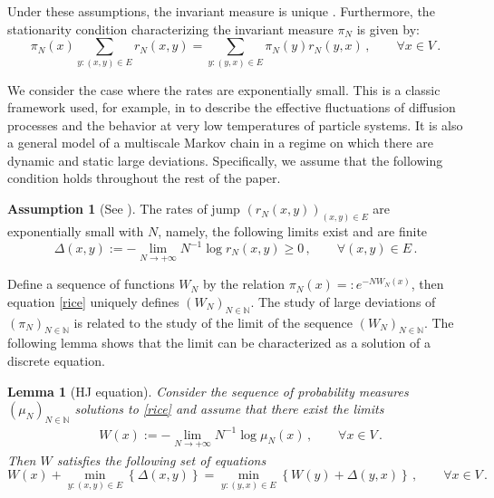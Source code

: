 \documentclass[reqno]{amsart}
\theoremstyle{plain}
\newtheorem{lemma}[theorem]{Lemma}
\theoremstyle{definition}
\newtheorem{assumption}[theorem]{Assumption}
\theoremstyle{remark}
\numberwithin{equation}{section}
\numberwithin{theorem}{section}
\newcommand{\<}{\langle}
\renewcommand{\>}{\rangle}
\begin{document}
Under these assumptions, the invariant measure is unique \cite{No}. Furthermore, the stationarity condition characterizing the invariant measure \(\pi_N\) is given by:
\begin{equation}\label{rice}
	\pi_N(x)\sum_{y: (x,y)\in E} r_N(x,y)=\sum_{y:(y,x)\in E} \pi_N(y)r_N(y,x)\,, \qquad \forall x\in V\,.
\end{equation}

We consider the case where the rates are exponentially small. This is a classic framework used, for example, in \cite{FW} to describe the effective fluctuations of diffusion processes and the behavior at very low temperatures of particle systems. It is also a general model of a multiscale Markov chain in a regime on which there are dynamic and static large deviations.  Specifically, we assume that the following condition holds throughout the rest of the paper.

\begin{assumption}[See \cite{OS2}]\label{assumption-1}
	The rates of jump $(r_N(x,y))_{(x,y)\in E}$ are exponentially small with $N$, namely, the following limits exist and are finite \begin{equation*}\Delta(x,y):=-\lim_{N\to +\infty} N^{-1}\log r_N(x,y)\geq 0\,, \qquad \forall(x,y)\in E\,.
	\end{equation*}
\end{assumption}

Define a sequence of functions $W_N$ by the relation $\pi_N(x)=:e^{-NW_N(x)}$, then equation \eqref{rice} uniquely defines $(W_N)_{N\in \mathbb N}$. The study of large deviations of $(\pi_N)_{N\in \mathbb N}$ is related to the study of the limit of the sequence $(W_N)_{N\in \mathbb N}$. The following lemma shows that the limit can be characterized as a solution of a discrete equation.  
\begin{lemma}[HJ equation]\label{lemma:HJe}
	Consider the sequence of probability measures $(\mu_N)_{N\in \mathbb N}$ solutions to \eqref{rice} and assume that there exist the limits
	\begin{align}
		&W(x):=-\lim_{N\to +\infty}N^{-1}\log \mu_N(x)\,, \qquad \forall x\in V\,. \label{ipo}
	\end{align} 
	Then $W$ satisfies the following set of equations 
	\begin{equation}\label{1HJ}
		W(x)+\min_{y:(x,y)\in E}\left\{\Delta(x,y)\right\}=\min_{y:(y,x)\in E}\left\{W(y)+\Delta(y,x)\right\}\,,\qquad \forall x\in V\,.
	\end{equation}
\end{lemma}
\end{document}
